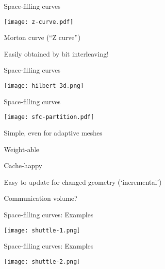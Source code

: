 \documentclass[english,compress]{beamer}
\begin{document}
\begin{frame}{Space-filling curves}
  \begin{center}
    \texttt{[image: z-curve.pdf]}

    Morton curve (``Z curve'')
  \end{center}

  Easily obtained by bit interleaving!
\end{frame}
\begin{frame}{Space-filling curves}
  \begin{center}
    \texttt{[image: hilbert-3d.png]}
  \end{center}
\end{frame}
\begin{frame}{Space-filling curves}
  \begin{center}
    \texttt{[image: sfc-partition.pdf]}
  \end{center}

  \vspace{-0.5cm}
  \plusball Simple, even for adaptive meshes

  \plusball Weight-able

  \plusball Cache-happy

  \plusball Easy to update for changed geometry (`incremental')

  \minusball Communication volume?

\end{frame}
\begin{frame}{Space-filling curves: Examples}
  \begin{center}
    \texttt{[image: shuttle-1.png]}
  \end{center}

\end{frame}
\begin{frame}{Space-filling curves: Examples}
  \begin{center}
    \texttt{[image: shuttle-2.png]}
  \end{center}

\end{frame}
\end{document}
